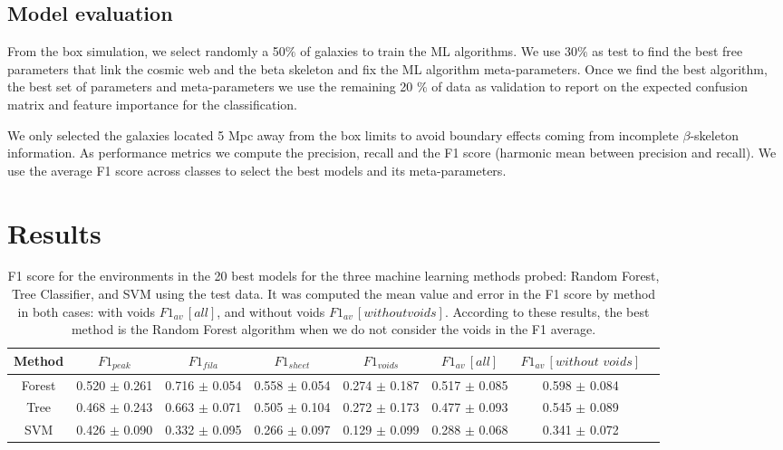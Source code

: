 \documentclass[usenatbib]{mnras}
\begin{document}
\subsection{Model evaluation}

From the box simulation, we select randomly a 50$\%$ of galaxies to train the ML algorithms. 
We use 30$\%$ as test to find the best free parameters that link the
cosmic web and the beta skeleton and fix the ML algorithm
meta-parameters.
Once we find the best algorithm, the best set of parameters and
meta-parameters we use the remaining 20 $\%$ of data as validation to
report on the expected confusion matrix and feature importance for the
classification.

We only selected the galaxies located 5 Mpc away from the box limits to avoid boundary effects coming from incomplete $\beta$-skeleton
information.
As performance metrics we compute the precision, recall and the F1 score (harmonic mean between precision and recall). 
We use the average F1 score across classes to select the best models
and its meta-parameters. 

\section{Results}\label{sec:results}

\begin{table}
\centering
\begin{tabular}{cccccccc}
\hline
 Method   & $F1_{peak}$     & $F1_{fila}$     & $F1_{sheet}$    & $F1_{voids}$    & $F1_{av}\,[all]$   & $F1_{av}\,[without \,\,voids]$   \\
\hline
 Forest   & 0.520 $\pm$ 0.261  & 0.716 $\pm$ 0.054 & 0.558 $\pm$ 0.054 & 0.274 $\pm$ 0.187 & 0.517 $\pm$ 0.085  & 0.598 $\pm$ 0.084 \\
 Tree     & 0.468 $\pm$ 0.243 & 0.663 $\pm$ 0.071 & 0.505 $\pm$ 0.104 & 0.272 $\pm$ 0.173 & 0.477 $\pm$ 0.093 & 0.545 $\pm$ 0.089  \\
 SVM      & 0.426 $\pm$ 0.090  & 0.332 $\pm$ 0.095 & 0.266 $\pm$ 0.097 & 0.129 $\pm$ 0.099 & 0.288 $\pm$ 0.068 & 0.341 $\pm$ 0.072   \\
\hline
\end{tabular}
\caption{F1 score for the environments 
in the 20 best models for
  the three machine learning methods probed: Random Forest, Tree
  Classifier, and SVM using the test data. It was computed the mean value and error in the
  F1 score by method in both cases: with voids $F1_{av}\,[all]$, and
  without voids $F1_{av}\,[without voids]$. According to these
  results, the best method is the Random Forest algorithm when we do
  not consider the voids in the F1 average.} 
\label{tab:methods}
\end{table}
\end{document}
